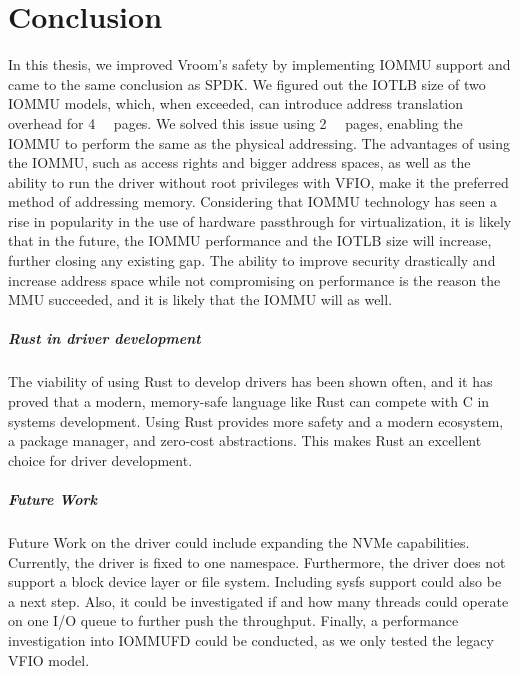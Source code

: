 \chapter{Conclusion}
In this thesis, we improved Vroom's safety by implementing IOMMU support and came to the same conclusion as SPDK.
We figured out the IOTLB size of two IOMMU models, which, when exceeded, can introduce address translation overhead for \qty{4}{\kibi\byte} pages.
We solved this issue using \qty{2}{\mebi\byte} pages, enabling the IOMMU to perform the same as the physical addressing.
The advantages of using the IOMMU, such as access rights and bigger address spaces, as well as the ability to run the driver without root privileges with VFIO, make it the preferred method of addressing memory.
Considering that IOMMU technology has seen a rise in popularity in the use of hardware passthrough for virtualization, it is likely that in the future, the IOMMU performance and the IOTLB size will increase, further closing any existing gap. The ability to improve security drastically and increase address space while not compromising on performance is the reason the MMU succeeded, and it is likely that the IOMMU will as well.

\paragraph{Rust in driver development}
The viability of using Rust to develop drivers has been shown often, and it has proved that a modern, memory-safe language like Rust can compete with C in systems development. Using Rust provides more safety and a modern ecosystem, a package manager, and zero-cost abstractions. This makes Rust an excellent choice for driver development.

\paragraph{Future Work}
Future Work on the driver could include expanding the NVMe capabilities. Currently, the driver is fixed to one namespace. Furthermore, the driver does not support a block device layer or file system. Including sysfs support could also be a next step.
Also, it could be investigated if and how many threads could operate on one I/O queue to further push the throughput. Finally, a performance investigation into IOMMUFD could be conducted, as we only tested the legacy VFIO model.
